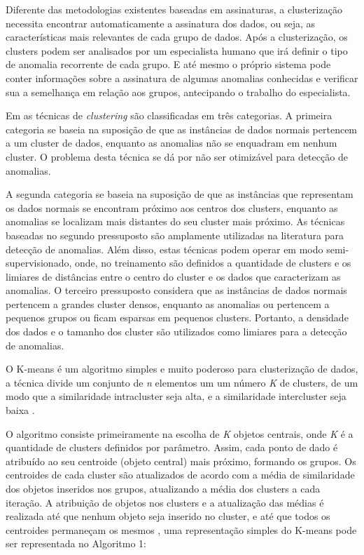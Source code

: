 \indent Diferente das metodologias existentes baseadas em assinaturas, a clusterização necessita encontrar automaticamente a assinatura dos dados, ou seja, as características mais relevantes de cada grupo de dados. Após a clusterização, os clusters podem ser analisados por um especialista humano que irá definir o tipo de anomalia recorrente de cada grupo. E até mesmo o próprio sistema pode conter informações sobre a assinatura de algumas anomalias conhecidas e verificar sua a semelhança em relação aos grupos, antecipando o trabalho do especialista.

\indent Em   as técnicas de \textit{clustering} são classificadas em três categorias. A primeira categoria se baseia na suposição de que as instâncias de dados normais pertencem a um cluster de dados, enquanto as anomalias não se enquadram em nenhum cluster. O problema desta técnica se dá por não ser otimizável para detecção de anomalias.

\indent A segunda categoria se baseia na suposição de que as instâncias que representam os dados normais se encontram próximo aos centros dos clusters, enquanto as anomalias se localizam mais distantes do seu cluster mais próximo. As técnicas baseadas no segundo pressuposto são amplamente utilizadas na literatura para detecção de anomalias. Além disso, estas técnicas podem operar em modo semi-supervisionado, onde, no treinamento são definidos a quantidade de clusters e os limiares de distâncias entre o centro do cluster e os dados que caracterizam as anomalias. O terceiro pressuposto considera que as instâncias de dados normais pertencem a grandes cluster  densos, enquanto as anomalias ou pertencem a pequenos grupos ou ficam esparsas em pequenos clusters. Portanto, a densidade dos dados e o tamanho dos cluster são utilizados como limiares para a detecção de anomalias.

\indent O K-means é um algoritmo simples e muito poderoso para clusterização de dados, a técnica divide um conjunto de \textit{n} elementos um um número \textit{K} de clusters, de um modo que a similaridade intracluster seja alta, e a similaridade intercluster seja baixa \cite{goldschmidt2005}.

\indent O algoritmo consiste primeiramente na escolha de \textit{K} objetos centrais, onde \textit{K} é a quantidade de clusters definidos por parâmetro. Assim, cada ponto de dado é atribuído ao seu centroide (objeto central) mais próximo, formando os grupos. Os centroides de cada cluster são atualizados de acordo com a média de similaridade dos objetos inseridos nos grupos, atualizando a média dos clusters a cada iteração. A atribuição de objetos nos clusters e a atualização das médias é realizada até que nenhum objeto seja inserido no cluster, e até que todos os centroides permaneçam os mesmos \cite{Tan2005}, uma representação simples do K-means pode ser representada no Algoritmo 1:

